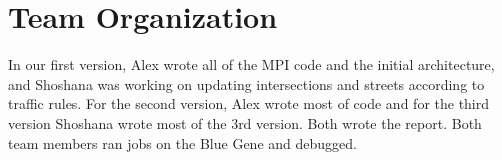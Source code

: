 \documentclass[10pt,a4paper]{article}
\begin{document}
\section{Team Organization}

In our first version, Alex wrote all of the MPI code and the initial architecture, and Shoshana was working on updating intersections and streets according to traffic rules. For the second version, Alex wrote most of code and for the third version Shoshana wrote most of the 3rd version. Both wrote the report. Both team members ran jobs on the Blue Gene and debugged.



\end{document}
